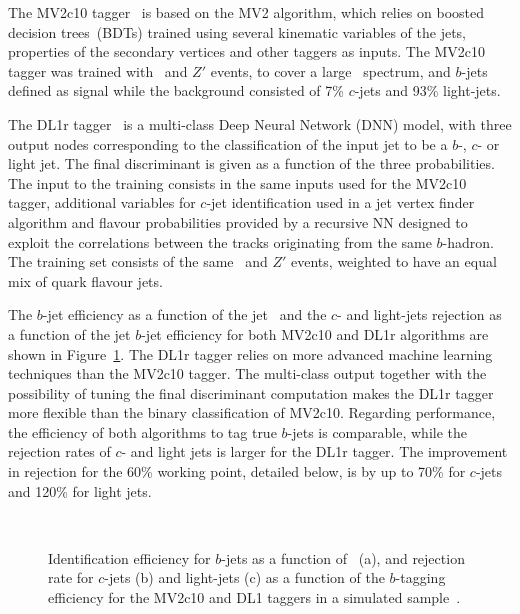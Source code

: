 The MV2c10 tagger~\cite{ATL-PHYS-PUB-2015-022} is based on the MV2 algorithm, which relies on boosted decision trees~(BDTs) trained using several kinematic variables of the jets, properties of the secondary vertices and other taggers as inputs. The MV2c10 tagger was trained with \ttbar\ and $Z'$ events, to cover a large \pT\ spectrum, and $b$-jets defined as signal while the background consisted of 7\% $c$-jets and 93\% light-jets.

The DL1r tagger~\cite{taggingeff} is a multi-class Deep Neural Network (DNN) model, with three output nodes corresponding to the classification of the input jet to be a $b$-, $c$- or light jet. The final discriminant is given as a function of the three probabilities. The input to the training consists in the same inputs used for the MV2c10 tagger, additional variables for $c$-jet identification used in a jet vertex finder algorithm and flavour probabilities provided by a recursive NN designed to exploit the correlations between the tracks originating from the same $b$-hadron. The training set consists of the same \ttbar\ and $Z'$ events, weighted to have an equal mix of quark flavour jets.

The $b$-jet efficiency as a function of the jet \pT\ and the $c$- and light-jets rejection as a function of the jet $b$-jet efficiency for both MV2c10 and DL1r algorithms are shown in Figure~\ref{figEVNTRECO:taggingeff}. The DL1r tagger relies on more advanced machine learning techniques than the MV2c10 tagger. The multi-class output together with the possibility of tuning the final discriminant computation makes the DL1r tagger more flexible than the binary classification of MV2c10. Regarding performance, the efficiency of both algorithms to tag true $b$-jets is comparable, while the rejection rates of $c$- and light jets is larger for the DL1r tagger. The improvement in rejection for the 60\% working point, detailed below, is by up to 70\% for $c$-jets and 120\% for light jets.

\begin{figure}[htbp]
    \RawFloats
    \begin{center}
         \\
        \quad
        \caption{
        Identification efficiency for $b$-jets as a function of \pT\ (a), and rejection rate for $c$-jets (b) and light-jets (c) as a function of the $b$-tagging efficiency for the MV2c10 and DL1 taggers in a simulated \ttbar sample~\cite{taggingeff}.
    }
    \label{figEVNTRECO:taggingeff}
    \end{center}
\end{figure}

